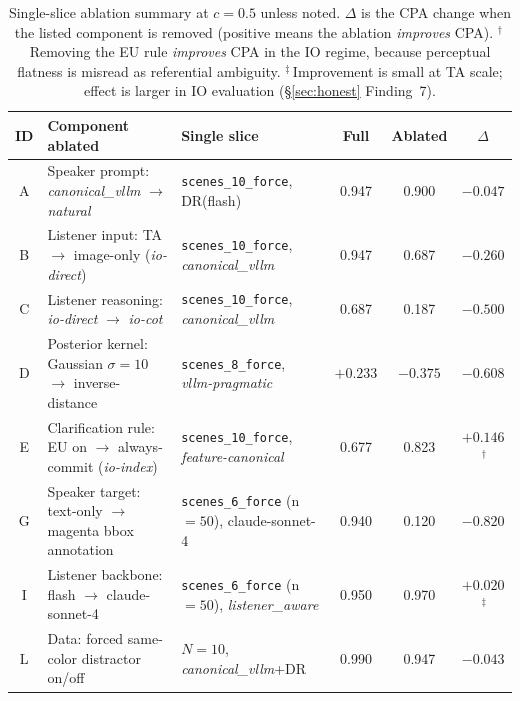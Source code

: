 \begin{table}[ht]
\centering
\small
\setlength{\tabcolsep}{4pt}
\begin{tabular}{cllccc}
\toprule
ID & Component ablated & Single slice
   & Full & Ablated & $\Delta$ \\
\midrule
A & Speaker prompt: \textit{canonical\_vllm} $\!\to\!$ \textit{natural}
  & \texttt{scenes\_10\_force}, DR(flash)
  & 0.947 & 0.900 & $-0.047$ \\
B & Listener input: TA $\!\to\!$ image-only (\textit{io-direct})
  & \texttt{scenes\_10\_force}, \textit{canonical\_vllm}
  & 0.947 & 0.687 & $-0.260$ \\
C & Listener reasoning: \textit{io-direct} $\!\to\!$ \textit{io-cot}
  & \texttt{scenes\_10\_force}, \textit{canonical\_vllm}
  & 0.687 & 0.187 & $-0.500$ \\
D & Posterior kernel: Gaussian $\sigma{=}10$ $\!\to\!$ inverse-distance
  & \texttt{scenes\_8\_force}, \textit{vllm-pragmatic}
  & $+0.233$ & $-0.375$ & $-0.608$ \\
E & Clarification rule: EU on $\!\to\!$ always-commit (\textit{io-index})
  & \texttt{scenes\_10\_force}, \textit{feature-canonical}
  & 0.677 & 0.823 & $+0.146$\,$^{\dagger}$ \\
G & Speaker target: text-only $\!\to\!$ magenta bbox annotation
  & \texttt{scenes\_6\_force} (n${=}50$), claude-sonnet-4
  & 0.940 & 0.120 & $-0.820$ \\
I & Listener backbone: flash $\!\to\!$ claude-sonnet-4
  & \texttt{scenes\_6\_force} (n${=}50$), \textit{listener\_aware}
  & 0.950 & 0.970 & $+0.020$\,$^{\ddagger}$ \\
L & Data: forced same-color distractor on/off
  & $N{=}10$, \textit{canonical\_vllm}+DR
  & 0.990 & 0.947 & $-0.043$ \\
\bottomrule
\end{tabular}
\caption{Single-slice ablation summary at $c{=}0.5$ unless noted.
$\Delta$ is the CPA change when the listed component is removed
(positive means the ablation \emph{improves} CPA).
$^{\dagger}$\,Removing the EU rule \emph{improves} CPA in the IO regime,
because perceptual flatness is misread as referential ambiguity.
$^{\ddagger}$\,Improvement is small at TA scale; effect is larger in IO
evaluation (\S\ref{sec:honest} Finding~7).}
\label{tab:ablations}
\end{table}
